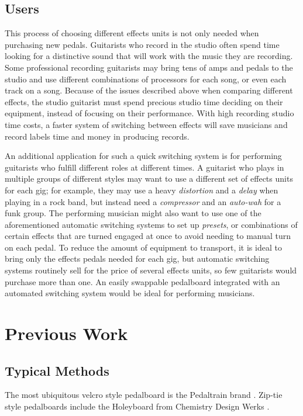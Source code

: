 \documentclass{article}
\begin{document}
\subsection{Users}

This process of choosing different effects units is not only needed when purchasing new pedals.  Guitarists who record in the studio often spend time looking for a distinctive sound that will work with the music they are recording.  Some professional recording guitarists may bring tens of amps and pedals to the studio and use different combinations of processors for each song, or even each track on a song.  Because of the issues described above when comparing different effects, the studio guitarist must spend precious studio time deciding on their equipment, instead of focusing on their performance.  With high recording studio time costs, a faster system of switching between effects will save musicians and record labels time and money in producing records.

An additional application for such a quick switching system is for performing guitarists who fulfill different roles at different times.  A guitarist who plays in multiple groups of different styles may want to use a different set of effects units for each gig; for example, they may use a heavy \emph{distortion} and a \emph{delay} when playing in a rock band, but instead need a \emph{compressor} and an \emph{auto-wah} for a funk group.  The performing musician might also want to use one of the aforementioned automatic switching systems to set up \emph{presets}, or combinations of certain effects that are turned engaged at once to avoid needing to manual turn on each pedal.  To reduce the amount of equipment to transport, it is ideal to bring only the effects pedals needed for each gig, but automatic switching systems routinely sell for the price of several effects units, so few guitarists would purchase more than one.  An easily swappable pedalboard integrated with an automated switching system would be ideal for performing musicians.


\section{Previous Work}

\subsection{Typical Methods}
The most ubiquitous velcro style pedalboard is the Pedaltrain brand \cite{CHANDLER:2000}\cite{PEDALTRAINSITE}.  Zip-tie style pedalboards include the Holeyboard from Chemistry Design Werks \cite{TRIFILIO:2017}\cite{HOLEYBOARDSITE}.
\end{document}
